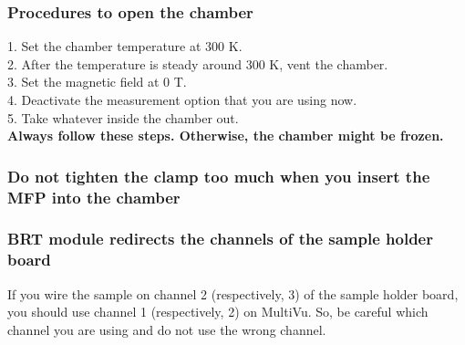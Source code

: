 \documentclass{article}
\begin{document}
        \subsubsection{Procedures to open the chamber}
            1. Set the chamber temperature at 300 K.\\
            2. After the temperature is steady around 300 K, vent the chamber.\\
            3. Set the magnetic field at 0 T.\\
            4. Deactivate the measurement option that you are using now.\\
            5. Take whatever inside the chamber out.\\
        \textbf{Always follow these steps. Otherwise, the chamber might be frozen.}\\

        \subsubsection{Do not tighten the clamp too much when you insert the MFP into the chamber}

        \subsubsection{BRT module redirects the channels of the sample holder board}
            If you wire the sample on channel 2 (respectively, 3) of the sample holder board, you should use channel 1 (respectively, 2) on MultiVu. So, be careful which channel you are using and do not use the wrong channel.
    
\end{document}
